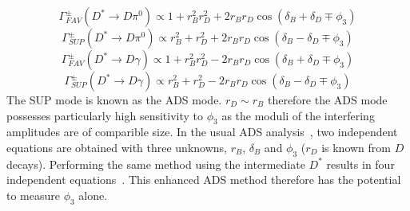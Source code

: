 \documentclass[oneside,12pt]{article}
\begin{document}
  \begin{equation}
		\Gamma_{FAV}^{\pm}(D^{*}\rightarrow D\pi^{0})\propto 1 + r_{B}^{2}r_{D}^{2} + 2r_{B}r_{D}\cos(\delta_{B} + \delta_{D} \mp \phi_{3})
    \label{eq:DecayRateADSFAVpi0}
  \end{equation}
  \begin{equation}
		\Gamma_{SUP}^{\pm}(D^{*}\rightarrow D\pi^{0})\propto r_{B}^{2} + r_{D}^{2} + 2r_{B}r_{D}\cos(\delta_{B} - \delta_{D} \mp \phi_{3})
    \label{eq:DecayRateADSSUPpi0}
  \end{equation}
  \begin{equation}
		\Gamma_{FAV}^{\pm}(D^{*}\rightarrow D\gamma)\propto 1 + r_{B}^{2}r_{D}^{2} - 2r_{B}r_{D}\cos(\delta_{B} + \delta_{D} \mp \phi_{3})
    \label{eq:DecayRateADSFAVgamma}
  \end{equation}
  \begin{equation}
		\Gamma_{SUP}^{\pm}(D^{*}\rightarrow D\gamma)\propto r_{B}^{2} + r_{D}^{2} - 2r_{B}r_{D}\cos(\delta_{B} - \delta_{D} \mp \phi_{3})
    \label{eq:DecayRateADSSUPgamma}
  \end{equation}
\noindent The SUP mode is known as the ADS mode. $r_{D} \sim r_{B}$ therefore the ADS mode possesses particularly high sensitivity to $\phi_3$ as the moduli of the interfering amplitudes are of comparible size. In the usual ADS analysis~\cite{ADSRef}, two independent equations are obtained with three unknowns, $r_B$, $\delta_B$ and $\phi_3$ ($r_{D}$ is known from $D$ decays). Performing the same method using the intermediate $D^*$ results in four independent equations~\cite{ADSDstar}. This enhanced ADS method therefore has the potential to measure $\phi_3$ alone.
\end{document}
